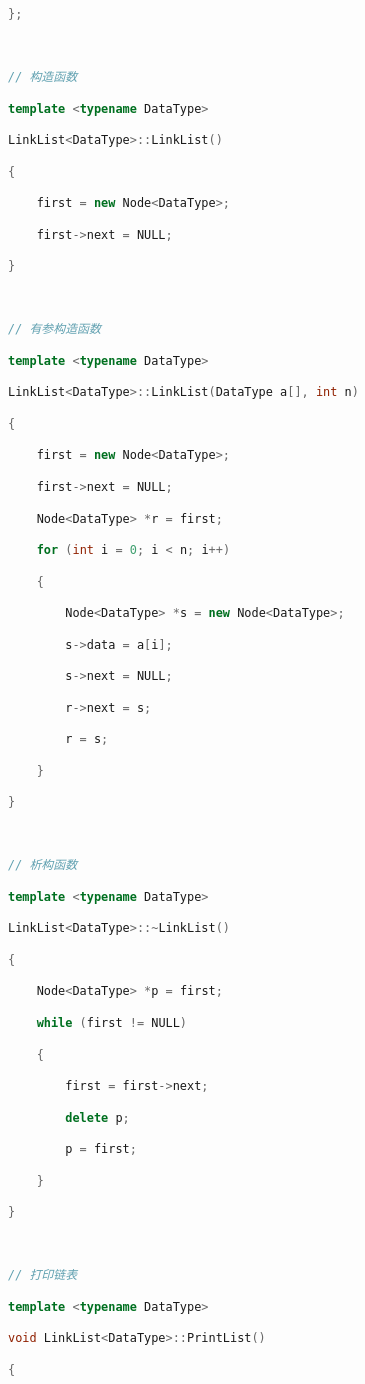 \begin{lstlisting}[language=C++]
};

  

// 构造函数

template <typename DataType>

LinkList<DataType>::LinkList()

{

    first = new Node<DataType>;

    first->next = NULL;

}

  

// 有参构造函数

template <typename DataType>

LinkList<DataType>::LinkList(DataType a[], int n)

{

    first = new Node<DataType>;

    first->next = NULL;

    Node<DataType> *r = first;

    for (int i = 0; i < n; i++)

    {

        Node<DataType> *s = new Node<DataType>;

        s->data = a[i];

        s->next = NULL;

        r->next = s;

        r = s;

    }

}

  

// 析构函数

template <typename DataType>

LinkList<DataType>::~LinkList()

{

    Node<DataType> *p = first;

    while (first != NULL)

    {

        first = first->next;

        delete p;

        p = first;

    }

}

  

// 打印链表

template <typename DataType>

void LinkList<DataType>::PrintList()

{


\end{lstlisting}
